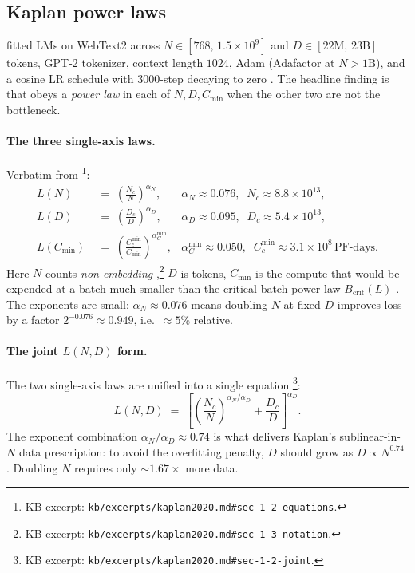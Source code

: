\subsection{Kaplan power laws}
\label{sec:scaling-kaplan}

\citet{kaplan2020} fitted   LMs on WebText2
across $N \in [768,\, 1.5 \times 10^9]$  and
$D \in [22\text{M},\, 23\text{B}]$ tokens, GPT-2  tokenizer,
context length $1024$, Adam (Adafactor at $N > 1\text{B}$), and a
cosine LR schedule with $3000$-step  decaying to zero
\citep[\S 2.2]{kaplan2020}. The headline finding is that
 obeys a \emph{power law} in each of $N, D, C_{\min}$
when the other two are not the bottleneck.

\paragraph{The three single-axis laws.}
Verbatim from \citet[\S 1.2, eqs.\ 1.1--1.3]{kaplan2020}\footnote{KB
excerpt: \texttt{kb/excerpts/kaplan2020.md\#sec-1-2-equations}.}:
\begin{align}
L(N) &\;=\; \left(\frac{N_c}{N}\right)^{\alpha_N},
   & \alpha_N \approx 0.076,\;\; N_c \approx 8.8 \times 10^{13}, \tag{1.1} \\
L(D) &\;=\; \left(\frac{D_c}{D}\right)^{\alpha_D},
   & \alpha_D \approx 0.095,\;\; D_c \approx 5.4 \times 10^{13}, \tag{1.2} \\
L(C_{\min}) &\;=\; \left(\frac{C_c^{\min}}{C_{\min}}\right)^{\alpha_C^{\min}},
   & \alpha_C^{\min} \approx 0.050,\;\; C_c^{\min} \approx 3.1 \times 10^{8}\,\text{PF-days}. \tag{1.3}
\end{align}
Here $N$ counts \emph{non-embedding} 
\citep[\S 1.3]{kaplan2020},\footnote{KB excerpt:
\texttt{kb/excerpts/kaplan2020.md\#sec-1-3-notation}.}
$D$ is tokens, $C_{\min}$ is the compute that would be expended at a
batch much smaller than the critical-batch power-law $B_{\text{crit}}(L)$
\citep[\S 5.1]{kaplan2020}. The exponents are small: $\alpha_N \approx
0.076$ means doubling $N$ at fixed $D$ improves loss by a factor
$2^{-0.076} \approx 0.949$, i.e.\ $\approx 5\%$ relative.

\paragraph{The joint $L(N, D)$ form.}
The two single-axis laws are unified into a single equation
\citep[\S 1.2, eq.\ 1.5]{kaplan2020}\footnote{KB excerpt:
\texttt{kb/excerpts/kaplan2020.md\#sec-1-2-joint}.}:
\begin{equation}
L(N, D) \;=\; \left[\left(\frac{N_c}{N}\right)^{\alpha_N/\alpha_D} + \frac{D_c}{D}\right]^{\alpha_D}.
\label{eq:kaplan-joint}
\tag{1.5}
\end{equation}
The exponent combination $\alpha_N/\alpha_D \approx 0.74$ is what
delivers Kaplan's sublinear-in-$N$ data prescription: to avoid the
overfitting penalty, $D$ should grow as $D \propto N^{0.74}$
\citep[\S 1.2]{kaplan2020}. Doubling $N$ requires only $\sim 1.67\times$
more data.


